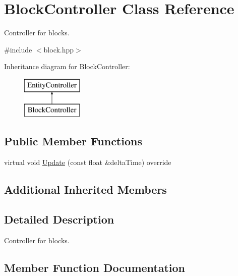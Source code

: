 \hypertarget{class_block_controller}{}\section{Block\+Controller Class Reference}
\label{class_block_controller}


Controller for blocks.  




{\ttfamily \#include $<$block.\+hpp$>$}

Inheritance diagram for Block\+Controller\+:\begin{figure}[H]
\begin{center}
\leavevmode
\includegraphics[height=2.000000cm]{class_block_controller}
\end{center}
\end{figure}
\subsection*{Public Member Functions}
\begin{DoxyCompactItemize}
\item 
virtual void \mbox{\hyperlink{class_block_controller_a991f89cc93c19d0fe4188bca55e77d04}{Update}} (const float \&delta\+Time) override
\end{DoxyCompactItemize}
\subsection*{Additional Inherited Members}


\subsection{Detailed Description}
Controller for blocks. 

\subsection{Member Function Documentation}
\mbox{\label{class_block_controller_a991f89cc93c19d0fe4188bca55e77d04}} 
